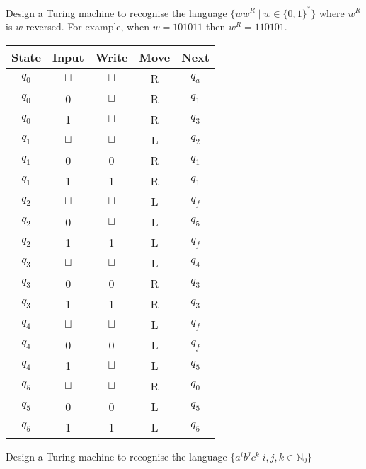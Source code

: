 \documentclass[addpoints,12pt]{exam}
\begin{document}
\begin{questions}
\question
  Design a Turing machine to recognise the language $\{ ww^R \mid w \in \{ 0,1 \}^* \}$ where $w^R$ is $w$ reversed.
  For example, when $w = 101011$ then $w^R = 110101$.
\begin{solution}
    \begin{table}[H]
      \centering
      \begin{tabular}{ccccc}
        \toprule
            State & Input & Write & Move & Next \\
        \midrule
            $q_0$ & $\sqcup$ & $\sqcup$ & R & $q_a$ \\
            $q_0$ & 0        & $\sqcup$ & R & $q_1$ \\
            $q_0$ & 1        & $\sqcup$ & R & $q_3$ \\
        \midrule
            $q_1$ & $\sqcup$ & $\sqcup$ & L & $q_2$ \\
            $q_1$ & 0        & 0        & R & $q_1$ \\
            $q_1$ & 1        & 1        & R & $q_1$ \\
        \midrule
            $q_2$ & $\sqcup$ & $\sqcup$ & L & $q_f$ \\
            $q_2$ & 0        & $\sqcup$ & L & $q_5$ \\
            $q_2$ & 1        & 1        & L & $q_f$ \\
        \midrule
            $q_3$ & $\sqcup$ & $\sqcup$ & L & $q_4$ \\
            $q_3$ & 0        & 0        & R & $q_3$ \\
            $q_3$ & 1        & 1        & R & $q_3$ \\
        \midrule
            $q_4$ & $\sqcup$ & $\sqcup$ & L & $q_f$ \\
            $q_4$ & 0        & 0        & L & $q_f$ \\
            $q_4$ & 1        & $\sqcup$ & L & $q_5$ \\
        \midrule
            $q_5$ & $\sqcup$ & $\sqcup$ & R & $q_0$ \\
            $q_5$ & 0        & 0        & L & $q_5$ \\
            $q_5$ & 1        & 1        & L & $q_5$ \\
        \bottomrule
        \hline
      \end{tabular}
    \end{table}
  \end{solution}



\question
  Design a Turing machine to recognise the language $\{ a^ib^jc^k | i,j,k \in \mathbb{N}_0 \}$


\end{questions}


\end{document}
